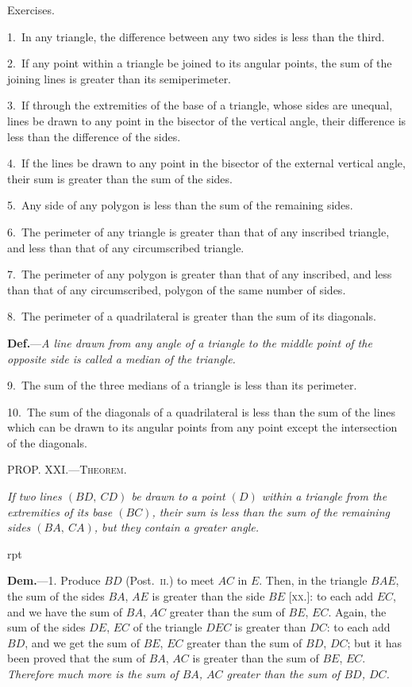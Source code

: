 \documentclass[oneside]{book}
\newcounter{wrapwidth}
\newcommand\mypropl[2]{
\bigskip\Needspace*{4\baselineskip}\begin{center}\textsc{#1}\end{center}
\hspace{\parindent}\emph{#2}\par\medskip
}
\newcommand\exhead[1]{
\Needspace*{5\baselineskip}\begin{center}
\textsf{#1}
\end{center}
}
\newcommand\imgflow[3]{
\setcounter{wrapwidth}{#1}

\begin{wrapfigure}[#2]{r}{\value{wrapwidth}pt}
\begin{center}
\vspace{-0.3in}

\end{center}
\end{wrapfigure}
}
\begin{document}
\exhead{Exercises.}

\begin{footnotesize}
1.~In any triangle, the difference between any two sides is less
than the third.

2.~If any point within a triangle be joined to its angular points,
the sum of the joining lines is greater than its semiperimeter.

3.~If through the extremities of the base of a triangle, whose
sides are unequal, lines be drawn to any point in the bisector of
the vertical angle, their difference is less than the difference of
the sides.

4.~If the lines be drawn to any point in the bisector of the
external vertical angle, their sum is greater than the sum of the
sides.


5.~Any side of any polygon is less than the sum of the remaining
sides.

6.~The perimeter of any triangle is greater than that of any
inscribed triangle, and less than that of any circumscribed triangle.

7.~The perimeter of any polygon is greater than that of any
inscribed, and less than that of any circumscribed, polygon of the
same number of sides.

8.~The perimeter of a quadrilateral is greater than the sum of
its diagonals.

\textbf{Def.}---\emph{A line drawn from any angle of a triangle to the middle
point of the opposite side is called a median of the triangle.}

9.~The sum of the three medians of a triangle is less than its
perimeter.

10.~The sum of the diagonals of a quadrilateral is less than the
sum of the lines which can be drawn to its angular points from
any point except the intersection of the diagonals.
\par\end{footnotesize}


\mypropl{PROP\@. XXI\@.---Theorem.}{If two lines $(BD,\ CD)$ be drawn to a point $(D)$ within
a triangle from the extremities of its base $(BC)$, their sum
is less than the sum of the remaining sides $(BA,\ CA)$, but
they contain a greater angle.}


\imgflow{125}{8}{f037}

\textbf{Dem.}---1. Produce $BD$ (Post.~\textsc{ii}.) to meet $AC$ in $E$.
Then, in the triangle $BAE$, the
sum of the sides $BA$, $AE$ is
greater than the side $BE$ [\textsc{xx}.]:
to each add $EC$, and we have
the sum of $BA$, $AC$ greater
than the sum of $BE$, $EC$. Again,
the sum of the sides $DE$, $EC$ of
the triangle $DEC$ is greater
than $DC$: to each add $BD$, and
we get the sum of $BE$, $EC$ greater than the sum of $BD$,
$DC$; but it has been proved that the sum of $BA$, $AC$ is
greater than the sum of $BE$, $EC$. \emph{Therefore much
more is the sum of $BA$, $AC$ greater than the sum of
$BD$, $DC$.}
\end{document}
